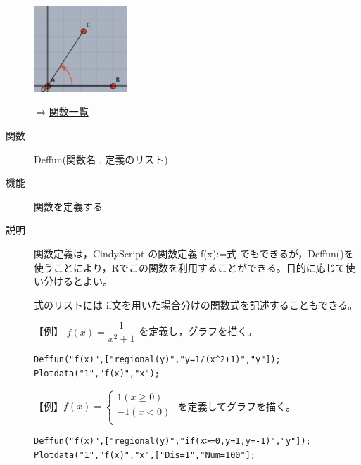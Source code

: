 \documentclass[papersize,a4paper,12pt,uplatex]{jsarticle}
\begin{document}
\begin{description}
\vspace{\baselineskip}
\hspace{20mm}%
\includegraphics[width=35mm,bb=0.00 0.00 176.00 165.00]{Fig/anglearrowscreen.pdf}%
\hspace{20mm}\scalebox{0.5}{}


\begin{flushright}\hyperlink{functionlist}{$\Rightarrow$関数一覧}\end{flushright}

\newpage

\vspace{\baselineskip}
\hypertarget{deffun}{}
\item[関数]Deffun(関数名 , 定義のリスト)
\item[機能]関数を定義する
\item[説明]関数定義は，CindyScript の関数定義 f(x):=式 でもできるが，Deffun()を使うことにより，Rでこの関数を利用することができる。目的に応じて使い分けるとよい。

式のリストには if文を用いた場合分けの関数式を記述することもできる。

\vspace{\baselineskip}
【例】
$f(x)=\dfrac{1}{x^2+1}$ を定義し，グラフを描く。

\begin{verbatim}
Deffun("f(x)",["regional(y)","y=1/(x^2+1)","y"]);
Plotdata("1","f(x)","x");
\end{verbatim}

\vspace{\baselineskip}
\hspace{20mm}\scalebox{0.9}{}


\vspace{\baselineskip}
【例】$f(x)=\left\{\begin{array}{l}1　 (x\geq 0)\\ -1 　 (x<0)\\ \end{array}\right.$ を定義してグラフを描く。

\begin{verbatim}
Deffun("f(x)",["regional(y)","if(x>=0,y=1,y=-1)","y"]);
Plotdata("1","f(x)","x",["Dis=1","Num=100"];
\end{verbatim}


\end{description}
\end{document}
